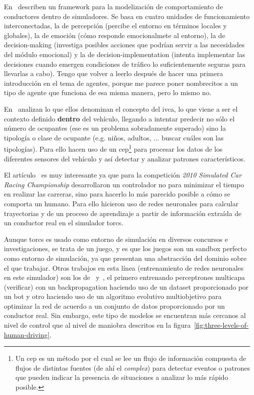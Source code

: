 En~\cite{al2001framework} describen un framework para la modelización de comportamiento de conductores dentro de simuladores. Se basa en cuatro unidades de funcionamiento interconectadas, la de percepción (percibe el entorno en términos locales y globales), la de emoción (cómo responde emocionalmete al entorno), la de decision-making (investiga posibles acciones que podrían servir a las necesidades del módulo emocional) y la de decision-implementation (intenta implementar las decisiones cuando emergen condiciones de tráfico lo suficientemente seguras para llevarlas a cabo). Tengo que volver a leerlo después de hacer una primera introducción en el tema de agentes, porque me parece poner nombrecitos a un tipo de agente que funciona de esa misma manera, pero lo mismo no.

En~\cite{terroso2015complex} analizan lo que ellos denominan el concepto del \gls{ivca}, lo que viene a ser el contexto definido \textbf{dentro} del vehículo, llegando a intentar predecir no sólo el número de ocupantes (ese es un problema sobradamente superado) sino la tipología o clase de ocupante (e.g. niños, adultos, ... \TODO buscar cuáles son las tipologías). Para ello hacen uso de un \gls{cep}\footnote{Un \gls{cep} es un método por el cual se lee un flujo de información compuesta de flujos de distintas fuentes (de ahí el \textit{complex}) para detectar eventos o patrones que pueden indicar la presencia de situaciones a analizar lo más rápido posible.} para procesar los datos de los diferentes sensores del vehículo y así detectar y analizar patrones característicos.

El artículo~\cite{munoz2010human} es muy interesante ya que para la competición \textit{2010 Simulated Car Racing Championship} desarrollaron un controlador no para minimizar el tiempo en realizar las carreras, sino para hacerlo lo más parecido posible a cómo se comporta un humano. Para ello hicieron uso de redes neuronales para calcular trayectorias y de un proceso de aprendizaje a partir de información extraída de un conductor real en el simulador \gls{torcs}.

Aunque \gls{torcs} es usado como entorno de simulación en diversos concursos e investigaciones, se trata de un juego, y es que los juegos son un sandbox perfecto como entorno de simulación, ya que presentan una abstracción del dominio sobre el que trabajar. Otros trabajos en esta línea (entrenamiento de redes neuronales en este simulador) son los de~\cite{munoz2009controller} y~\cite{van2009robust}, el primero entrenando perceptrones multicapa (\TODO verificar) con un backpropagation haciendo uso de un dataset proporcionado por un bot y otro haciendo uso de un algoritmo evolutivo multiobjetivo para optimizar la red de acuerdo a un conjunto de datos proporcionado por un conductor real. Sin embargo, este tipo de modelos se encuentran más cercanos al nivel de control que al nivel de maniobra descritos en la figura~\ref{fig:three-levels-of-human-driving}.

